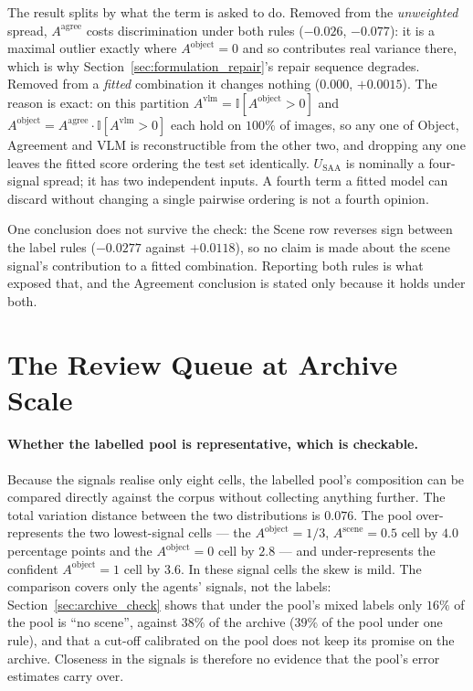 \documentclass[12pt,a4paper]{report}
\begin{document}
The result splits by what the term is asked to do. Removed from the \emph{unweighted} spread,
$A^{\text{agree}}$ costs discrimination under both rules ($-0.026$, $-0.077$): it is a maximal
outlier exactly where $A^{\text{object}}=0$ and so contributes real variance there, which is why
Section~\ref{sec:formulation_repair}'s repair sequence degrades. Removed from a \emph{fitted}
combination it changes nothing ($0.000$, $+0.0015$). The reason is exact: on this partition
$A^{\text{vlm}} = \mathbb{I}[A^{\text{object}}>0]$ and $A^{\text{object}} =
A^{\text{agree}}\cdot\mathbb{I}[A^{\text{vlm}}>0]$ each hold on $100\%$ of images, so any one of
Object, Agreement and VLM is reconstructible from the other two, and dropping any one leaves the
fitted score ordering the test set identically. $U_{\text{SAA}}$ is nominally a four-signal spread;
it has two independent inputs. A fourth term a fitted model can discard without changing a single
pairwise ordering is not a fourth opinion.

One conclusion does not survive the check: the Scene row reverses sign between the label rules
($-0.0277$ against $+0.0118$), so no claim is made about the scene signal's contribution to a
fitted combination. Reporting both rules is what exposed that, and the Agreement conclusion is
stated only because it holds under both.


\section{The Review Queue at Archive Scale}
\label{sec:archive_queue}
\paragraph{Whether the labelled pool is representative, which is checkable.} Because the
signals realise only eight cells, the labelled pool's composition can be compared directly
against the corpus without collecting anything further. The total variation distance between
the two distributions is $0.076$. The pool over-represents the two lowest-signal cells --- the
$A^{\text{object}}=1/3$, $A^{\text{scene}}=0.5$ cell by $4.0$ percentage points and the
$A^{\text{object}}=0$ cell by $2.8$ --- and under-represents the confident
$A^{\text{object}}=1$ cell by $3.6$. In these signal cells the skew is mild. The comparison covers only the agents' signals, not the labels: Section~\ref{sec:archive_check} shows that under the pool's mixed labels only $16\%$ of the pool is ``no scene'', against $38\%$ of the archive ($39\%$ of the pool under one rule), and that a cut-off calibrated on the pool does not keep its promise on the archive. Closeness in the signals is therefore no evidence that the pool's error estimates carry over.
\end{document}
